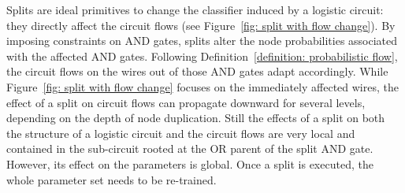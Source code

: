 \documentclass[letterpaper]{article} %
\begin{document}
Splits are ideal primitives to change the classifier induced by a logistic circuit: they directly affect the circuit flows (see Figure~\ref{fig: split with flow change}). By imposing constraints on AND gates, splits alter the node probabilities associated with the affected AND gates. Following Definition~\ref{definition: probabilistic flow}, the circuit flows on the wires out of those AND gates adapt accordingly. While Figure~\ref{fig: split with flow change} focuses on the immediately affected wires, the effect of a split on circuit flows can propagate downward for several levels, depending on the depth of node duplication. Still the effects of a split on both the structure of a logistic circuit and the circuit flows are very local and contained in the sub-circuit rooted at the OR parent of the split AND gate. However, its effect on the parameters is global. Once a split is executed, the whole parameter set needs to be re-trained.
\end{document}
